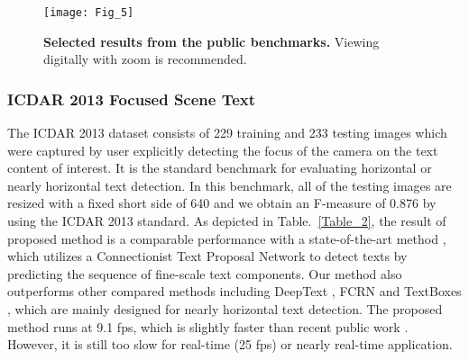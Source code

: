 \documentclass[3p, times]{elsarticle}
\begin{document}
\begin{figure}[!htb]
\centering
\texttt{[image: Fig\_5]}
\caption{\textbf{Selected results from the public benchmarks.} Viewing digitally with zoom is recommended.}
\label{Fig_5}
\end{figure}



\subsubsection{ICDAR 2013 Focused Scene Text}

The ICDAR 2013 \cite{ICDAR2013} dataset consists of 229 training and 233 testing images which were captured by user explicitly detecting the focus of the camera on the text content of interest. It is the standard benchmark for evaluating horizontal or nearly horizontal text detection. In this benchmark, all of the testing images are resized with a fixed short side of 640 and we obtain an F-measure of 0.876 by using the ICDAR 2013 standard. As depicted in Table.~\ref{Table_2}, the result of proposed method is a comparable performance with a state-of-the-art method \cite{CTPN2016ECCV}, which utilizes a Connectionist Text Proposal Network to detect texts by predicting the sequence of fine-scale text components. Our method also outperforms other compared methods including DeepText \cite{DEEPTEXT2016ARXIV}, FCRN \cite{FCRN2016CVPR} and TextBoxes \cite{TEXTBOX2017AAAI}, which are mainly designed for nearly horizontal text detection. The proposed method runs at 9.1 fps, which is slightly faster than recent public work \cite{SSTD2017ICCV}. However, it is still too slow for real-time (25 fps) or nearly real-time application.
\end{document}
